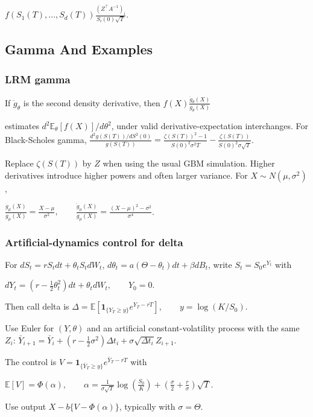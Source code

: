 $f(S_1(T),\ldots,S_d(T))\frac{(Z^\top A^{-1})_i}{S_i(0)\sqrt T}$.

\subsection{Gamma And Examples}

\subsubsection*{LRM gamma}

If $\ddot g_\theta$ is the second density derivative, then
$f(X)\frac{\ddot g_\theta(X)}{g_\theta(X)}$

estimates $d^2\mathbb{E}_\theta[f(X)]/d\theta^2$, under valid derivative-expectation interchanges. For Black-Scholes gamma,
$\frac{d^2g(S(T))/dS^2(0)}{g(S(T))}=\frac{\zeta(S(T))^2-1}{S(0)^2\sigma^2T}-\frac{\zeta(S(T))}{S(0)^2\sigma\sqrt T}$.

Replace $\zeta(S(T))$ by $Z$ when using the usual GBM simulation. Higher derivatives introduce higher powers and often larger variance. For $X\sim N(\mu,\sigma^2)$,

$\frac{\dot g_\mu(X)}{g_\mu(X)}=\frac{X-\mu}{\sigma^2},\qquad \frac{\ddot g_\mu(X)}{g_\mu(X)}=\frac{(X-\mu)^2-\sigma^2}{\sigma^4}$.

\subsubsection*{Artificial-dynamics control for delta}

For $dS_t=rS_tdt+\theta_tS_tdW_t$, $d\theta_t=a(\Theta-\theta_t)dt+\beta dB_t$, write $S_t=S_0e^{Y_t}$ with

$dY_t=(r-\frac12\theta_t^2)dt+\theta_tdW_t,\qquad Y_0=0$.

Then call delta is
$\Delta=\mathbb{E}\left[\mathbf{1}_{\{Y_T\ge y\}}e^{Y_T-rT}\right],\qquad y=\log(K/S_0)$.

Use Euler for $(Y,\theta)$ and an artificial constant-volatility process with the same $Z_i$:
$\bar Y_{i+1}=\bar Y_i+(r-\frac12\sigma^2)\Delta t_i+\sigma\sqrt{\Delta t_i}Z_{i+1}$.

The control is $V=\mathbf{1}_{\{\bar Y_T\ge y\}}e^{\bar Y_T-rT}$ with

$\mathbb{E}[V]=\Phi(\alpha),\qquad \alpha=\frac{1}{\sigma\sqrt T}\log\left(\frac{S_0}{K}\right)+\left(\frac{\sigma}{2}+\frac{r}{\sigma}\right)\sqrt T$.

Use output $X-b\{V-\Phi(\alpha)\}$, typically with $\sigma=\Theta$.

